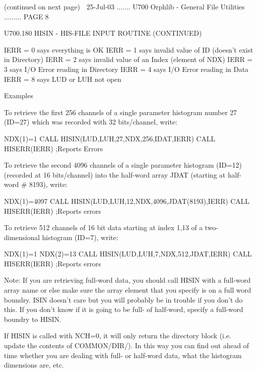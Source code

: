  
                            (continued on next page)
    
   25-Jul-03 ....... U700  Orphlib - General File Utilities ......... PAGE   8
 
   U700.180  HISIN    - HIS-FILE INPUT ROUTINE (CONTINUED)
 
   IERR = 0 says everything is OK
   IERR = 1 says invalid value of ID (doesn't exist in Directory)
   IERR = 2 says invalid value of an Index (element of NDX)
   IERR = 3 says I/O Error reading in Directory
   IERR = 4 says I/O Error reading in Data
   IERR = 8 says LUD or LUH not open
 
                                    Examples
 
   To retrieve the first 256 channels of a single parameter  histogram  number
   27 (ID=27) which was recorded with 32 bits/channel, write:
 
         NDX(1)=1
         CALL HISIN(LUD,LUH,27,NDX,256,IDAT,IERR)
         CALL HISERR(IERR)                                ;Reports Errors
 
   To  retrieve  the  second  4096  channels  of  a single parameter histogram
   (ID=12) (recorded  at  16  bits/channel)  into  the  half-word  array  JDAT
   (starting at half-word # 8193), write:
 
         NDX(1)=4097
         CALL HISIN(LUD,LUH,12,NDX,4096,JDAT(8193),IERR)
         CALL HISERR(IERR)                                ;Reports errors
 
   To  retrieve  512  channels  of  16  bit  data  starting at index 1,13 of a
   two-dimensional histogram (ID=7), write:
 
         NDX(1)=1
         NDX(2)=13
         CALL HISIN(LUD,LUH,7,NDX,512,JDAT,IERR)
         CALL HISERR(IERR)                                ;Reports errors
 
   Note: If you are retrieving full-word data, you should call  HISIN  with  a
   full-word  array  name or else make sure the array element that you specify
   is on a full word boundry. ISIN doesn't care but you will  probably  be  in
   trouble  if  you  don't  do   this.  If you don't know if it is going to be
   full- of half-word, specify a full-word boundry to HISIN.
 
   If HISIN is called with NCH=0, it will  only  return  the  directory  block
   (i.e.  update  the  contents  of COMMON/DIR/). In this way you can find out
   ahead of time whether you are dealing with full- or  half-word  data,  what
   the histogram dimensions are, etc.
 
